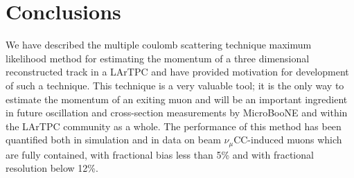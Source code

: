 \documentclass[a4paper,11pt]{article}
\begin{document}
\section{Conclusions}
We have described the multiple coulomb scattering technique maximum likelihood method for estimating the momentum of a three dimensional reconstructed track in a LArTPC and have provided motivation for development of such a technique. This technique is a very valuable tool; it is the only way to estimate the momentum of an exiting muon and will be an important ingredient in future oscillation and cross-section measurements by MicroBooNE and within the LArTPC community as a whole. The performance of this method has been quantified both in simulation and in data on beam $\nu_\mu$CC-induced muons which are fully contained, with fractional bias less than 5\% and with fractional resolution below 12\%. 










\end{document}
